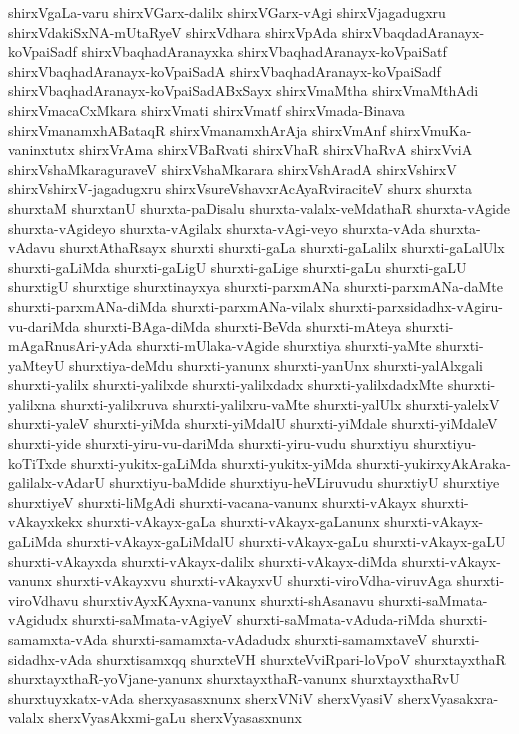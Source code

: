 {shirxVgaLa-varu
shirxVGarx-dalilx
shirxVGarx-vAgi
shirxVjagadugxru
shirxVdakiSxNA-mUtaRyeV
shirxVdhara
shirxVpAda
shirxVbaqdadAranayx-koVpaiSadf
shirxVbaqhadAranayxka
shirxVbaqhadAranayx-koVpaiSatf
shirxVbaqhadAranayx-koVpaiSadA
shirxVbaqhadAranayx-koVpaiSadf
shirxVbaqhadAranayx-koVpaiSadABxSayx
shirxVmaMtha
shirxVmaMthAdi
shirxVmacaCxMkara
shirxVmati
shirxVmatf
shirxVmada-Binava
shirxVmanamxhABataqR
shirxVmanamxhArAja
shirxVmAnf
shirxVmuKa-vaninxtutx
shirxVrAma
shirxVBaRvati
shirxVhaR
shirxVhaRvA
shirxVviA
shirxVshaMkaraguraveV
shirxVshaMkarara
shirxVshAradA
shirxVshirxV
shirxVshirxV-jagadugxru
shirxVsureVshavxrAcAyaRviraciteV
shurx
shurxta
shurxtaM
shurxtanU
shurxta-paDisalu
shurxta-valalx-veMdathaR
shurxta-vAgide
shurxta-vAgideyo
shurxta-vAgilalx
shurxta-vAgi-veyo
shurxta-vAda
shurxta-vAdavu
shurxtAthaRsayx
shurxti
shurxti-gaLa
shurxti-gaLalilx
shurxti-gaLalUlx
shurxti-gaLiMda
shurxti-gaLigU
shurxti-gaLige
shurxti-gaLu
shurxti-gaLU
shurxtigU
shurxtige
shurxtinayxya
shurxti-parxmANa
shurxti-parxmANa-daMte
shurxti-parxmANa-diMda
shurxti-parxmANa-vilalx
shurxti-parxsidadhx-vAgiru-vu-dariMda
shurxti-BAga-diMda
shurxti-BeVda
shurxti-mAteya
shurxti-mAgaRnusAri-yAda
shurxti-mUlaka-vAgide
shurxtiya
shurxti-yaMte
shurxti-yaMteyU
shurxtiya-deMdu
shurxti-yanunx
shurxti-yanUnx
shurxti-yalAlxgali
shurxti-yalilx
shurxti-yalilxde
shurxti-yalilxdadx
shurxti-yalilxdadxMte
shurxti-yalilxna
shurxti-yalilxruva
shurxti-yalilxru-vaMte
shurxti-yalUlx
shurxti-yalelxV
shurxti-yaleV
shurxti-yiMda
shurxti-yiMdalU
shurxti-yiMdale
shurxti-yiMdaleV
shurxti-yide
shurxti-yiru-vu-dariMda
shurxti-yiru-vudu
shurxtiyu
shurxtiyu-koTiTxde
shurxti-yukitx-gaLiMda
shurxti-yukitx-yiMda
shurxti-yukirxyAkAraka-galilalx-vAdarU
shurxtiyu-baMdide
shurxtiyu-heVLiruvudu
shurxtiyU
shurxtiye
shurxtiyeV
shurxti-liMgAdi
shurxti-vacana-vanunx
shurxti-vAkayx
shurxti-vAkayxkekx
shurxti-vAkayx-gaLa
shurxti-vAkayx-gaLanunx
shurxti-vAkayx-gaLiMda
shurxti-vAkayx-gaLiMdalU
shurxti-vAkayx-gaLu
shurxti-vAkayx-gaLU
shurxti-vAkayxda
shurxti-vAkayx-dalilx
shurxti-vAkayx-diMda
shurxti-vAkayx-vanunx
shurxti-vAkayxvu
shurxti-vAkayxvU
shurxti-viroVdha-viruvAga
shurxti-viroVdhavu
shurxtivAyxKAyxna-vanunx
shurxti-shAsanavu
shurxti-saMmata-vAgidudx
shurxti-saMmata-vAgiyeV
shurxti-saMmata-vAduda-riMda
shurxti-samamxta-vAda
shurxti-samamxta-vAdadudx
shurxti-samamxtaveV
shurxti-sidadhx-vAda
shurxtisamxqq
shurxteVH
shurxteVviRpari-loVpoV
shurxtayxthaR
shurxtayxthaR-yoVjane-yanunx
shurxtayxthaR-vanunx
shurxtayxthaRvU
shurxtuyxkatx-vAda
sherxyasasxnunx
sherxVNiV
sherxVyasiV
sherxVyasakxra-valalx
sherxVyasAkxmi-gaLu
sherxVyasasxnunx
}
